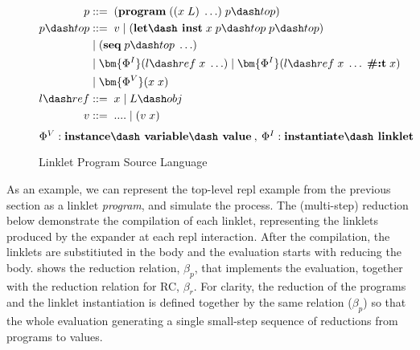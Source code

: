 \begin{wrapfigure}[13]{r}{0.5\textwidth}
  \footnotesize
  \vspace{-0.5cm}
  \begin{mdframed}
    \begin{align*}
      p           &::=\; (\textbf{program}\; ((x\; L)\; \ldots)\; p\dash top) \\
      p\dash top  &::=\; v\; |\; (\textbf{let\dash inst}\; x\; p\dash top\;p\dash top) \\
      \;          &\;|\; (\textbf{seq}\; p\dash top\; \ldots) \\
      \;          &\;|\; \bm{\Phi^I}(l\dash ref\; x\; \ldots)\; |\; \bm{\Phi^I}(l\dash ref\; x\; \ldots\; \textbf{\#:t}\; x) \\
      \;          &\;|\; \bm{\Phi^V}(x\; x) \\
      l\dash ref &::=\; x\; |\; L\dash obj \\
      v           &::=\; ....\;|\;(v\;x) \\
    \end{align*}
    \hfill \footnotesize $\Phi^V : \textbf{instance\dash variable\dash value}\:,\: \Phi^I : \textbf{instantiate\dash linklet}$
    \caption[bbbb]{Linklet Program Source Language \footnotemark}
    \label{fig:linklet-program}
  \end{mdframed}
\end{wrapfigure}


As an example, we can represent the top-level repl example from the
previous section as a linklet \emph{program}, and simulate the
process. The (multi-step) reduction below demonstrate the compilation of each
linklet, representing the linklets produced by the expander at each
repl interaction. After the compilation, the linklets are substitiuted
in the body and the evaluation starts with reducing the
body.  shows the reduction relation, $\beta_p$, that
implements the evaluation, together with the reduction relation for
RC, $\beta_r$. For clarity, the reduction of the programs and the linklet
instantiation is defined together by the same relation ($\beta_p$) so that
the whole evaluation generating a single small-step sequence of
reductions from programs to values.


